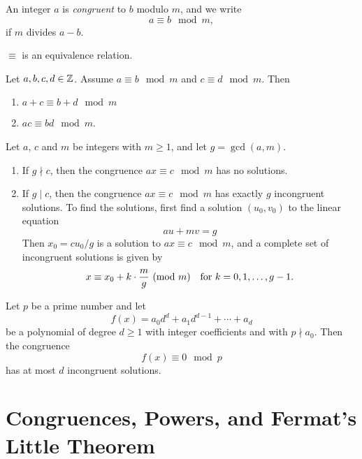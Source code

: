 \documentclass[10pt]{article}
\begin{document}
\begin{definition*}[\textcolor{red}{Congruence}] An integer $a$ is \emph{congruent} to $b$ modulo $m$, and we write
    \[a \equiv b \mod{m},\]
    if $m$ divides $a-b$.
\end{definition*}


\begin{proposition*} $\equiv$ is an equivalence relation.
\end{proposition*}


\begin{proposition*} Let $a,b,c,d \in \Z$. Assume $a \equiv b \mod{m}$ and $c \equiv d \mod{m}$. Then 
    \begin{enumerate}[label=(\roman*)]
        \item $a+c \equiv b + d \mod{m}$
        \item $ac \equiv bd \mod{m}$.
    \end{enumerate}
\end{proposition*}


\begin{theorem}[\textcolor{red}{Linear Congruence Theorem}] Let $a$, $c$ and $m$ be integers with $m \geq 1$, and let $g= \gcd(a,m)$.
    \begin{enumerate}[label=(\alph*)]
        \item If $g \nmid c$, then the congruence $ax \equiv c \mod{m}$ has no solutions.
        \item If $g \mid c$, then the congruence $ax \equiv c \mod{m}$ has exactly $g$ incongruent solutions. To find the solutions, first find a solution $(u_0,v_0)$ to the linear equation
            \[au+mv=g\]
    Then $x_0=cu_0/g$ is a solution to $ax \equiv c \mod {m}$, and a complete set of incongruent solutions is given by 
            \[x \equiv x_0 + k \cdot \frac{m}{g} \mod{m} \quad \textnormal{for $k = 0,1,\ldots,g-1$}.\]
    \end{enumerate}
\end{theorem}


\begin{theorem}[\textcolor{red}{Polynomial Roots modulo $p$ Theorem}] Let $p$ be a prime number and let 
    \[f(x) = a_0d^d+a_1 d^{d-1} + \cdots + a_d\]
    be a polynomial of degree $d \geq 1$ with integer coefficients and with $p \nmid a_0$. Then the congruence
    \[f(x) \equiv 0 \mod{p}\]
    has at most $d$ incongruent solutions.
\end{theorem}


\section{Congruences, Powers, and Fermat's Little Theorem}
\end{document}
